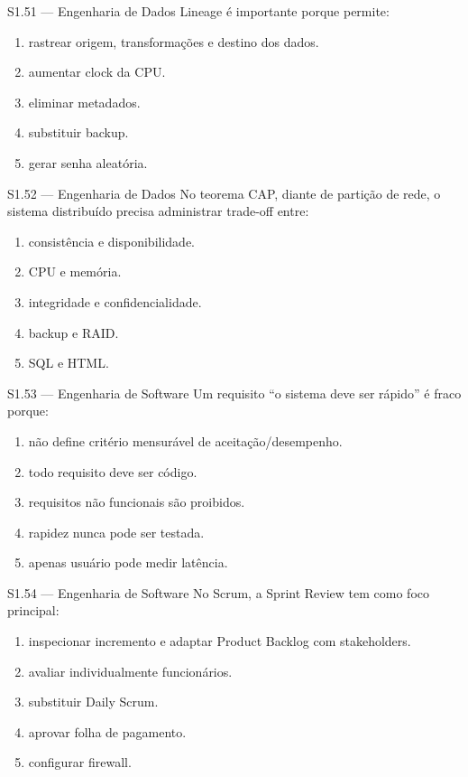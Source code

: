 \begin{questao}{S1.51 — Engenharia de Dados}
Lineage é importante porque permite:
\begin{enumerate}[label=\Alph*)]\item rastrear origem, transformações e destino dos dados.\item aumentar clock da CPU.\item eliminar metadados.\item substituir backup.\item gerar senha aleatória.\end{enumerate}
\end{questao}

\begin{questao}{S1.52 — Engenharia de Dados}
No teorema CAP, diante de partição de rede, o sistema distribuído precisa administrar trade-off entre:
\begin{enumerate}[label=\Alph*)]\item consistência e disponibilidade.\item CPU e memória.\item integridade e confidencialidade.\item backup e RAID.\item SQL e HTML.\end{enumerate}
\end{questao}

\begin{questao}{S1.53 — Engenharia de Software}
Um requisito ``o sistema deve ser rápido'' é fraco porque:
\begin{enumerate}[label=\Alph*)]\item não define critério mensurável de aceitação/desempenho.\item todo requisito deve ser código.\item requisitos não funcionais são proibidos.\item rapidez nunca pode ser testada.\item apenas usuário pode medir latência.\end{enumerate}
\end{questao}

\begin{questao}{S1.54 — Engenharia de Software}
No Scrum, a Sprint Review tem como foco principal:
\begin{enumerate}[label=\Alph*)]\item inspecionar incremento e adaptar Product Backlog com stakeholders.\item avaliar individualmente funcionários.\item substituir Daily Scrum.\item aprovar folha de pagamento.\item configurar firewall.\end{enumerate}
\end{questao}

